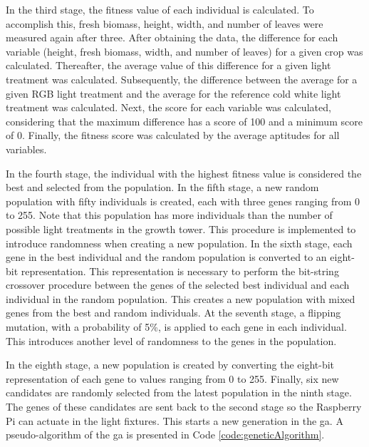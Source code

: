 \documentclass[preprint, review, 12pt]{elsarticle}
\begin{document}
In the third stage, the fitness value of each individual is calculated. To accomplish this, fresh biomass, height, width, and number of leaves were measured again after three. After obtaining the data, the difference for each variable (height,  fresh biomass, width, and number of leaves) for a given crop was calculated. Thereafter, the average value of this difference for a given light treatment was calculated. Subsequently, the difference between the average for a given RGB light treatment and the average for the reference cold white light treatment was calculated. Next, the score for each variable was calculated, considering that the maximum difference has a score of 100 and a minimum score of 0. Finally, the fitness score was calculated by the average aptitudes for all variables. 

In the fourth stage, the individual with the highest fitness value is considered the best and selected from the population. In the fifth stage, a new random population with fifty individuals is created, each with three genes ranging from 0 to 255. Note that this population has more individuals than the number of possible light treatments in the growth tower. This procedure is implemented to introduce randomness when creating a new population. In the sixth stage, each gene in the best individual and the random population is converted to an eight-bit representation. This representation is necessary to perform the bit-string crossover procedure between the genes of the selected best individual and each individual in the random population. This creates a new population with mixed genes from the best and random individuals. At the seventh stage, a flipping mutation, with a probability of 5\%, is applied to each gene in each individual. This introduces another level of randomness to the genes in the population. 

In the eighth stage, a new population is created by converting the eight-bit representation of each gene to values ranging from 0 to 255. Finally, six new candidates are randomly selected from the latest population in the ninth stage. The genes of these candidates are sent back to the second stage so the Raspberry Pi can actuate in the light fixtures. This starts a new generation in the \gls{ga}. A pseudo-algorithm of the \gls{ga} is presented in Code \ref{code:geneticAlgorithm}. 
\end{document}

